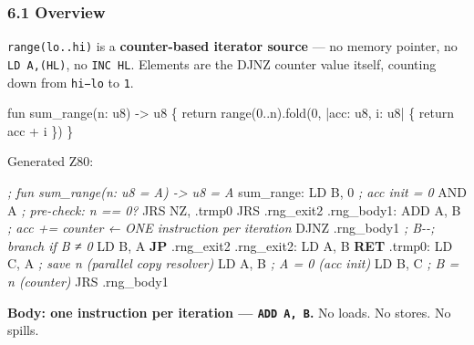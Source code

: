 \documentclass[
  11pt,
]{article}
\newenvironment{Shaded}{}{}
\newcommand{\BuiltInTok}[1]{\textcolor[rgb]{0.00,0.50,0.00}{#1}}
\newcommand{\CommentTok}[1]{\textcolor[rgb]{0.38,0.63,0.69}{\textit{#1}}}
\newcommand{\ControlFlowTok}[1]{\textcolor[rgb]{0.00,0.44,0.13}{\textbf{#1}}}
\newcommand{\DecValTok}[1]{\textcolor[rgb]{0.25,0.63,0.44}{#1}}
\newcommand{\FunctionTok}[1]{\textcolor[rgb]{0.02,0.16,0.49}{#1}}
\newcommand{\NormalTok}[1]{#1}
\newcommand{\OperatorTok}[1]{\textcolor[rgb]{0.40,0.40,0.40}{#1}}
\begin{document}
\subsubsection{6.1 Overview}\label{overview}

\texttt{range(lo..hi)} is a \textbf{counter-based iterator source} ---
no memory pointer, no \texttt{LD\ A,(HL)}, no \texttt{INC\ HL}. Elements
are the DJNZ counter value itself, counting down from \texttt{hi−lo} to
\texttt{1}.

\begin{Shaded}
\begin{Highlighting}[]
\NormalTok{fun sum\_range(n: u8) {-}\textgreater{} u8 \{}
\NormalTok{    return range(0..n).fold(0, |acc: u8, i: u8| \{ return acc + i \})}
\NormalTok{\}}
\end{Highlighting}
\end{Shaded}

Generated Z80:

\begin{Shaded}
\begin{Highlighting}[]
\CommentTok{; fun sum\_range(n: u8 = A) {-}\textgreater{} u8 = A}
\FunctionTok{sum\_range:}
\NormalTok{    LD B}\OperatorTok{,} \DecValTok{0}              \CommentTok{; acc init = 0}
    \BuiltInTok{AND}\NormalTok{ A                }\CommentTok{; pre{-}check: n == 0?}
\NormalTok{    JRS NZ}\OperatorTok{,} \OperatorTok{.}\NormalTok{trmp0}
\NormalTok{    JRS }\OperatorTok{.}\NormalTok{rng\_exit2}
\FunctionTok{.rng\_body1:}
    \BuiltInTok{ADD}\NormalTok{ A}\OperatorTok{,}\NormalTok{ B             }\CommentTok{; acc += counter  ← ONE instruction per iteration}
\NormalTok{    DJNZ }\OperatorTok{.}\NormalTok{rng\_body1      }\CommentTok{; B{-}{-}; branch if B ≠ 0}
\NormalTok{    LD B}\OperatorTok{,}\NormalTok{ A}
    \ControlFlowTok{JP} \OperatorTok{.}\NormalTok{rng\_exit2}
\FunctionTok{.rng\_exit2:}
\NormalTok{    LD A}\OperatorTok{,}\NormalTok{ B}
    \ControlFlowTok{RET}
\FunctionTok{.trmp0:}
\NormalTok{    LD C}\OperatorTok{,}\NormalTok{ A              }\CommentTok{; save n (parallel copy resolver)}
\NormalTok{    LD A}\OperatorTok{,}\NormalTok{ B              }\CommentTok{; A = 0 (acc init)}
\NormalTok{    LD B}\OperatorTok{,}\NormalTok{ C              }\CommentTok{; B = n (counter)}
\NormalTok{    JRS }\OperatorTok{.}\NormalTok{rng\_body1}
\end{Highlighting}
\end{Shaded}

\textbf{Body: one instruction per iteration --- \texttt{ADD\ A,\ B}.} No
loads. No stores. No spills.
\end{document}
